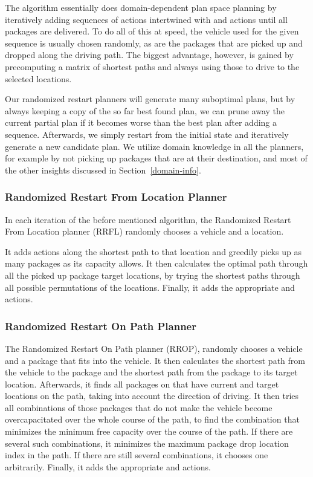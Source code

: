 The algorithm essentially does domain-dependent plan space planning
by iteratively adding sequences of \drive{} actions
intertwined with \pickup{} and \drop{} actions
until all packages are delivered.
To do all of this at speed, the vehicle used for the given sequence
is usually chosen randomly, as are the packages that are picked up and dropped along the driving path.
The biggest advantage, however, is gained by precomputing
a matrix of shortest paths and always using those to drive to the
selected locations.

Our randomized restart planners will generate many suboptimal plans,
but by always keeping a copy of the so far best found plan,
we can prune away the current partial plan if it becomes
worse than the best plan after adding a sequence.
Afterwards, we simply restart
from the initial state and iteratively generate a new candidate plan.
We utilize domain knowledge in all the planners,
for example by not picking up packages that are at their destination,
and most of the other insights discussed in Section~\ref{domain-info}.

\subsubsection{Randomized Restart From Location Planner}\label{rrfl}

In each iteration of the before mentioned algorithm,
the Randomized Restart From Location planner (RRFL)
randomly chooses a vehicle and a location.

It adds \drive{} actions along the shortest path
to that location and greedily picks up as many packages as
its capacity allows.
It then calculates the optimal
path through all the picked up package target locations,
by trying the shortest paths through all possible permutations
of the locations.
Finally, it adds the appropriate \drive{} and \drop{} actions.

\subsubsection{Randomized Restart On Path Planner}\label{rrop}

The Randomized Restart On Path planner (RROP),
randomly chooses a vehicle
and a package that fits into the vehicle.
It then calculates the shortest path from the vehicle
to the package
and the shortest path from the package to its target location.
Afterwards, it finds all packages on that have current and target locations on the path, taking into account the direction of driving.
It then tries all combinations of
those packages that do not make the vehicle become
overcapacitated over the whole course
of the path,
to find the combination that minimizes the minimum
free capacity over the course of the path.
If there are several such combinations, it minimizes the
maximum package drop location index in the path.
If there are still several combinations, it chooses one arbitrarily.
Finally, it adds the appropriate \drive{} and \drop{} actions.

